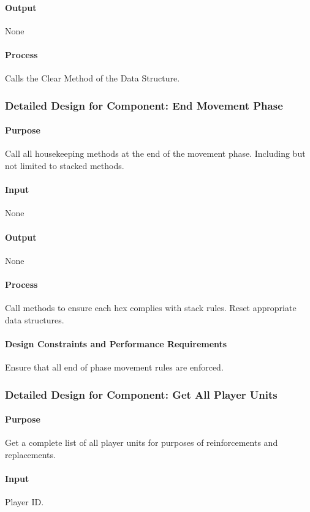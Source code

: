 \documentclass[12pt,a4paper,titlepage]{article}
\begin{document}
\paragraph{Output} None
\paragraph{Process} Calls the Clear Method of the Data Structure.

\subsubsection{Detailed Design for Component: End Movement Phase}
\paragraph{Purpose} Call all housekeeping methods at the end of the movement phase.  Including but not limited to stacked methods.
\paragraph{Input} None
\paragraph{Output} None
\paragraph{Process} Call methods to ensure each hex complies with stack rules. Reset appropriate data structures.
\paragraph{Design Constraints and Performance Requirements} Ensure that all end of phase movement rules are enforced.

\subsubsection{Detailed Design for Component: Get All Player Units}
\paragraph{Purpose} Get a complete list of all player units for purposes of reinforcements and replacements.
\paragraph{Input} Player ID.
\end{document}

